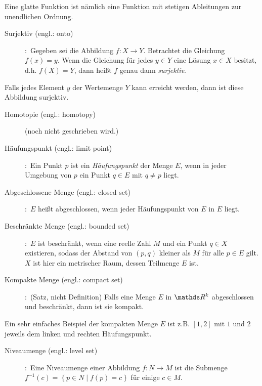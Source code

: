 \vspace{-0.8em}
Eine glatte Funktion ist nämlich eine Funktion mit stetigen Ableitungen zur unendlichen Ordnung.
\begin{description}
	\item[Surjektiv (engl.: onto)]
	\cite[S.931]{grosche2003teubner}:~Gegeben sei die Abbildung $f:X \to Y$. Betrachtet die Gleichung $f\left ( x \right )=y$. Wenn die Gleichung für jedes $y\in Y$ eine Lösung $x\in X$ besitzt, d.h. $f\left ( X \right )=Y$, dann heißt $f$ genau dann \emph{surjektiv}.
\end{description}
\vspace{-0.8em}
Falls jedes Element $y$ der Wertemenge $Y$ kann erreicht werden, dann ist diese Abbildung surjektiv. 
\begin{description}
	\item[Homotopie (engl.: homotopy)]
	\cite[]{}(noch nicht geschrieben wird.)
\end{description}
\vspace{-0.8em}
\begin{description}
	\item[Häufungspunkt (engl.: limit point)]
	\cite[S.35]{rudin2009analysis}:~Ein Punkt $p$ ist ein \emph{Häufungspunkt} der Menge $E$, wenn in jeder Umgebung von $p$ ein Punkt $q\in E$ mit $q\neq p$ liegt.
	\item[Abgeschlossene Menge (engl.: closed set)]
	\cite[S.36]{rudin2009analysis}:~$E$ heißt abgeschlossen, wenn jeder Häufungspunkt von $E$ in $E$ liegt.
	\item[Beschränkte Menge (engl.: bounded set)]
	\cite[S.36]{rudin2009analysis}:~$E$ ist beschränkt, wenn eine reelle Zahl $M$ und ein Punkt $q\in X$ existieren, sodass der Abstand von $(p,q)$ kleiner als $M$ für alle $p\in E$ gilt. $X$ ist hier ein metrischer Raum, dessen Teilmenge $E$ ist.
	\item[Kompakte Menge (engl.: compact set)]
	\cite[S.45]{rudin2009analysis}:~(Satz, nicht Definition) Falls eine Menge $E$ in $\Reals^{k}$ abgeschlossen und beschränkt, dann ist sie kompakt.
\end{description}
\vspace{-0.8em}
Ein sehr einfaches Beispiel der kompakten Menge $E$ ist z.B. $\left [ 1,2 \right ]$ mit $1$ und $2$ jeweils dem linken und rechten Häufungspunkt. %
\begin{description}
	\item[Niveaumenge (engl.: level set)]
	\cite[S.94]{tu2010introduction}:~Eine Niveaumenge einer Abbildung $f:N \to M$ ist die Submenge $f^{-1}\left ( c \right )= \left \{ p\in N \mid f\left ( p \right )= c\right \}$ für einige $c\in M$.
\end{description}
